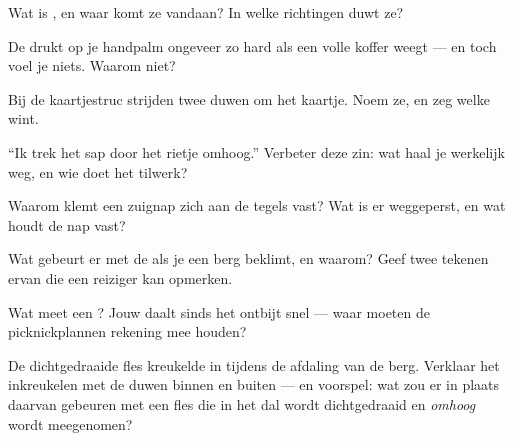 \begin{exercise}[$\star$]\label{exo:g5:air-pressure-weather:2}
Wat is , en waar komt ze vandaan? In welke richtingen duwt
ze?
\end{exercise}

\begin{exercise}[$\star$]\label{exo:g5:air-pressure-weather:3}
De  drukt op je handpalm ongeveer zo hard als een volle
koffer weegt --- en toch voel je niets. Waarom niet?
\end{exercise}

\begin{exercise}[$\star$]\label{exo:g5:air-pressure-weather:4}
Bij de kaartjestruc strijden twee duwen om het kaartje. Noem ze, en
zeg welke wint.
\end{exercise}

\begin{exercise}[$\star$]\label{exo:g5:air-pressure-weather:5}
``Ik trek het sap door het rietje omhoog.'' Verbeter deze zin: wat
haal je werkelijk weg, en wie doet het tilwerk?
\end{exercise}

\begin{exercise}[$\star$]\label{exo:g5:air-pressure-weather:6}
Waarom klemt een zuignap zich aan de tegels vast? Wat is er
weggeperst, en wat houdt de nap vast?
\end{exercise}

\begin{exercise}[$\star$]\label{exo:g5:air-pressure-weather:7}
Wat gebeurt er met de  als je een berg beklimt, en waarom?
Geef twee tekenen ervan die een reiziger kan opmerken.
\end{exercise}

\begin{exercise}[$\star$]\label{exo:g5:air-pressure-weather:8}
Wat meet een ? Jouw  daalt sinds het ontbijt
snel --- waar moeten de picknickplannen rekening mee houden?
\end{exercise}

\begin{exercise}[$\star\star$]\label{exo:g5:air-pressure-weather:9}
De dichtgedraaide fles kreukelde in tijdens de afdaling van de berg.
Verklaar het inkreukelen met de duwen binnen en buiten --- en
voorspel: wat zou er in plaats daarvan gebeuren met een fles die in
het dal wordt dichtgedraaid en \emph{omhoog} wordt meegenomen?
\end{exercise}

